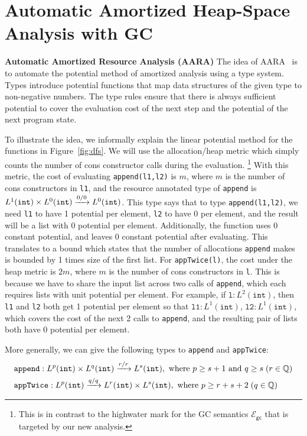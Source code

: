 \documentclass{easychair}
\newcommand{\ms}[1]{\ensuremath{\mathsf{#1}}}
\newcommand{\irl}[1]{\mathtt{#1}}
\newcounter{rule}
\newcommand{\gcSem}{\ensuremath{\mathcal{E}_{\ms{gc}}}}
\theoremstyle{definition}
\begin{document}
\section{Automatic Amortized Heap-Space Analysis with GC}
\label{sect:aara}

{\bf Automatic Amortized Resource Analysis (AARA)}
%
The idea of AARA~\cite{Jost03,Jost10,HoffmannAH10,HoffmannW15} is to automate the potential method of amortized
analysis using a type system.  Types introduce potential functions that
map data structures of the given type to non-negative numbers. The
type rules ensure that there is always sufficient potential to cover
the evaluation cost of the next step and the potential of the
next program state.

To illustrate the idea, we informally explain the linear potential method for the functions in Figure~\ref{fig:dfs}.
We will use the allocation/heap metric which simply counts the number of cons constructor calls during the evaluation.%
\footnote{This is in contrast to the highwater mark for the GC semantics \gcSem{} that is targeted by our new analysis.}
With this metric, the cost of evaluating \texttt{append(l1,l2)} is $m$, where $m$ is the number 
of cons constructors in \texttt{l1}, and the resource annotated type of \texttt{append} is 
$\prodtycst{L^1(\irl{int})}{L^0(\irl{int})} \xrightarrow{0/0} L^0(\irl{int})$.
This type says that to type \texttt{append(l1,l2)}, we need \texttt{l1} 
to have 1 potential per element, \texttt{l2} to have 0 per element, and the result 
will be a list with 0 potential per element.
Additionally, the function uses 0 constant potential, and 
leaves 0 constant potential after evaluating. This translates to a bound which states that 
the number of allocations \texttt{append} makes is bounded by 1 times size of the first list.
For \texttt{appTwice(l)}, the cost under the heap metric is $2m$, where $m$ is the number of cons 
constructors in \texttt{l}. This is because we have to share the input list across 
two calls of \texttt{append}, which each requires lists with unit potential per element.
For example, if $\texttt{l} : L^2(\irl{int})$, then \texttt{l1} and 
\texttt{l2} both get 1 potential per element so that $\texttt{l1} : L^1(\irl{int})$,
$\texttt{l2} : L^1(\irl{int})$, which covers the cost of the next 2 calls to \texttt{append}, 
and the resulting pair of lists both have 0 potential per element.

More generally, we can give the following types to \texttt{append} and \texttt{appTwice}:
\begin{align*}
	&\texttt{append} : \prodtycst{L^p(\irl{int})}{L^q(\irl{int})} \xrightarrow{r/r} L^s(\irl{int}), \text{ 
	where } p \ge s + 1 \text{ and } q \ge s \; (r \in \mathbb{Q})\\
	&\texttt{appTwice} : L^p(\irl{int}) \xrightarrow{q/q} \prodtycst{L^r(\irl{int})}{L^s(\irl{int})},
	\text{ where } p \ge r + s + 2 \; (q \in \mathbb{Q})
\end{align*}
\end{document}
